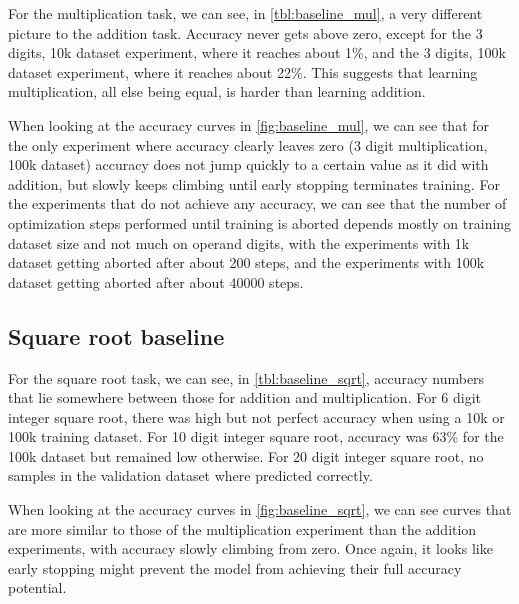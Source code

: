 For the multiplication task, we can see, in \cref{tbl:baseline_mul}, a very different picture to the addition task. Accuracy never gets above zero, except for the 3 digits, 10k dataset experiment, where it reaches about 1\%, and the 3 digits, 100k dataset experiment, where it reaches about 22\%.
This suggests that learning multiplication, all else being equal, is harder than learning addition.

When looking at the accuracy curves in  \cref{fig:baseline_mul}, we can see that for the only experiment where accuracy clearly leaves zero (3 digit multiplication, 100k dataset) accuracy does not jump quickly to a certain value as it did with addition, but slowly keeps climbing until early stopping terminates training.
For the experiments that do not achieve any accuracy, we can see that the number of optimization steps performed until training is aborted depends mostly on training dataset size and not much on operand digits, with the experiments with 1k dataset getting aborted after about 200 steps, and the experiments with 100k dataset getting aborted after about 40000 steps.



\subsection{Square root baseline}

For the square root task, we can see, in \cref{tbl:baseline_sqrt}, accuracy numbers that lie somewhere between those for addition and multiplication.
For 6 digit integer square root, there was high but not perfect accuracy when using a 10k or 100k training dataset.
For 10 digit integer square root, accuracy was 63\% for the 100k dataset but remained low otherwise. For 20 digit integer square root, no samples in the validation dataset where predicted correctly.

When looking at the accuracy curves in \cref{fig:baseline_sqrt}, we can see curves that are more similar to those of the multiplication experiment than the addition experiments, with accuracy slowly climbing from zero. Once again, it looks like early stopping might prevent the model from achieving their full accuracy potential.

